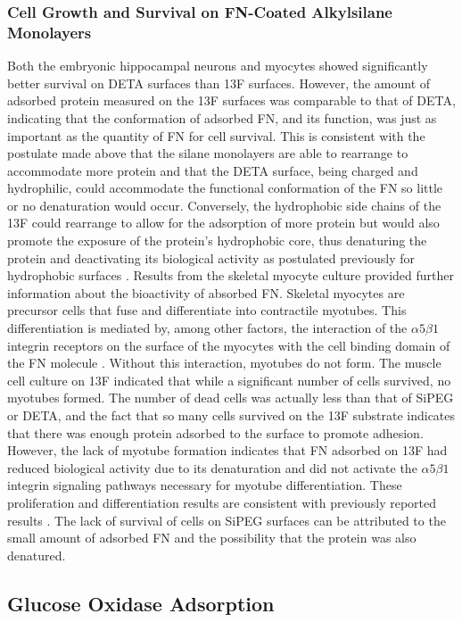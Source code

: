 \subsubsection{Cell Growth and Survival on FN-Coated Alkylsilane Monolayers}

Both the embryonic hippocampal neurons and myocytes showed significantly
better survival on DETA surfaces than 13F surfaces. However, the amount
of adsorbed protein measured on the 13F surfaces was comparable to
that of DETA, indicating that the conformation of adsorbed FN, and
its function, was just as important as the quantity of FN for cell
survival. This is consistent with the postulate made above that the
silane monolayers are able to rearrange to accommodate more protein
and that the DETA surface, being charged and hydrophilic, could accommodate
the functional conformation of the FN so little or no denaturation
would occur. Conversely, the hydrophobic side chains of the 13F could
rearrange to allow for the adsorption of more protein but would also
promote the exposure of the protein's hydrophobic core, thus denaturing
the protein and deactivating its biological activity as postulated
previously for hydrophobic surfaces \cite{Keselowsky2003}. Results
from the skeletal myocyte culture provided further information about
the bioactivity of absorbed FN. Skeletal myocytes are precursor cells
that fuse and differentiate into contractile myotubes. This differentiation
is mediated by, among other factors, the interaction of the $\alpha5\beta1$
integrin receptors on the surface of the myocytes with the cell binding
domain of the FN molecule \cite{Michael2003}. Without this interaction,
myotubes do not form. The muscle cell culture on 13F indicated that
while a significant number of cells survived, no myotubes formed.
The number of dead cells was actually less than that of SiPEG or DETA,
and the fact that so many cells survived on the 13F substrate indicates
that there was enough protein adsorbed to the surface to promote adhesion.
However, the lack of myotube formation indicates that FN adsorbed
on 13F had reduced biological activity due to its denaturation and
did not activate the $\alpha5\beta1$ integrin signaling pathways
necessary for myotube differentiation. These proliferation and differentiation
results are consistent with previously reported results \cite{Michael2003}.
The lack of survival of cells on SiPEG surfaces can be attributed
to the small amount of adsorbed FN and the possibility that the protein
was also denatured. 


\subsection{Glucose Oxidase Adsorption}

